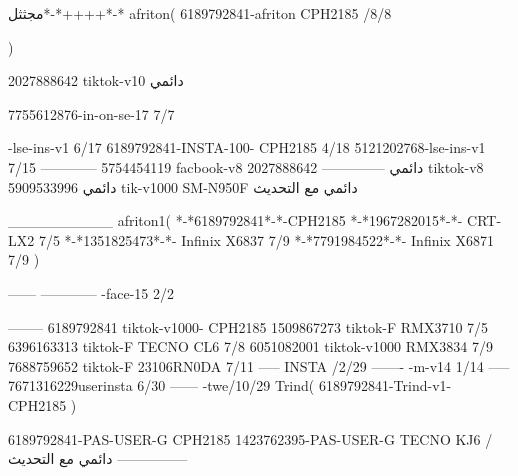 مجثثل*-*++++*-*
afriton(
6189792841-afriton CPH2185  /8/8

)

2027888642 tiktok-v10
دائمي

7755612876-in-on-se-17 7/7

-lse-ins-v1 6/17
6189792841-INSTA-100- CPH2185 4/18
5121202768-lse-ins-v1 7/15
------------
5754454119 facbook-v8
دائمي
--------------
2027888642 tiktok-v8
دائمي
5909533996 tik-v1000  SM-N950F
دائمي مع التحديث

__________
afriton1(
*-*6189792841*-*-CPH2185
*-*1967282015*-*-  CRT-LX2  7/5
*-*1351825473*-*-  Infinix X6837  7/9
*-*7791984522*-*-  Infinix X6871  7/9
)


------
------------
-face-15 2/2

--------
6189792841 tiktok-v1000- CPH2185 
1509867273 tiktok-F RMX3710  7/5
6396163313 tiktok-F TECNO CL6  7/8
6051082001 tiktok-v1000 RMX3834  7/9
7688759652 tiktok-F 23106RN0DA  7/11
-----
 INSTA /2/29
-------
-m-v14 1/14
-----
7671316229userinsta 6/30
------
-twe/10/29
Trind(
6189792841-Trind-v1- CPH2185 
)


6189792841-PAS-USER-G CPH2185 
1423762395-PAS-USER-G TECNO KJ6  /دائمي مع التحديث
    ---------------
